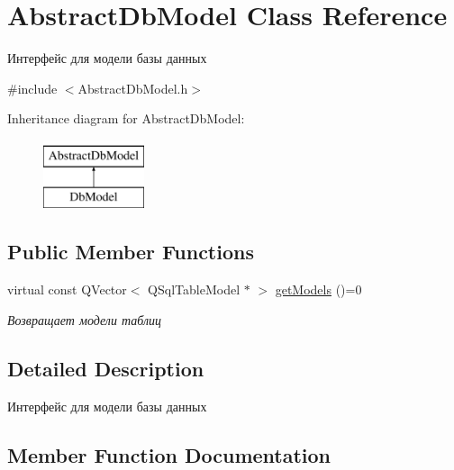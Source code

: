 \hypertarget{class_abstract_db_model}{}\section{Abstract\+Db\+Model Class Reference}
\label{class_abstract_db_model}


Интерфейс для модели базы данных  




{\ttfamily \#include $<$Abstract\+Db\+Model.\+h$>$}

Inheritance diagram for Abstract\+Db\+Model\+:\begin{figure}[H]
\begin{center}
\leavevmode
\includegraphics[height=2.000000cm]{class_abstract_db_model}
\end{center}
\end{figure}
\subsection*{Public Member Functions}
\begin{DoxyCompactItemize}
\item 
virtual const Q\+Vector$<$ Q\+Sql\+Table\+Model $\ast$ $>$ \hyperlink{class_abstract_db_model_aa0f683c2d6cc8d3018baaaba8b1bff9c}{get\+Models} ()=0
\begin{DoxyCompactList}\small\item\em Возвращает модели таблиц \end{DoxyCompactList}\end{DoxyCompactItemize}


\subsection{Detailed Description}
Интерфейс для модели базы данных 

\subsection{Member Function Documentation}
\mbox{\label{class_abstract_db_model_aa0f683c2d6cc8d3018baaaba8b1bff9c}} 
